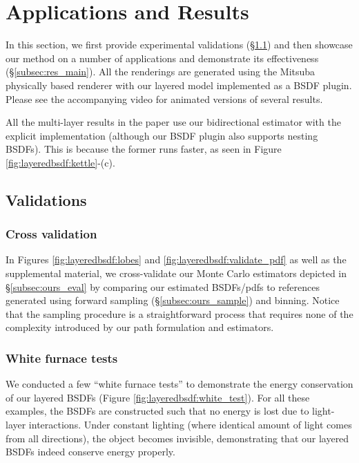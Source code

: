 \section{Applications and Results}
\label{sec:layeredbsdf:results}

In this section, we first provide experimental validations (\S\ref{subsec:res_validation}) and then showcase our method on a number of applications and demonstrate its effectiveness (\S\ref{subsec:res_main}).
All the renderings are generated using the Mitsuba physically based renderer \cite{jakob2010mitsuba} with our layered model implemented as a BSDF plugin.
Please see the accompanying video for animated versions of several results.

All the multi-layer results in the paper use our bidirectional estimator with the explicit implementation (although our BSDF plugin also supports nesting BSDFs).
This is because the former runs faster, as seen in Figure \ref{fig:layeredbsdf:kettle}-(c).

\subsection{Validations}
\label{subsec:res_validation}

\subsubsection{Cross validation}
In Figures \ref{fig:layeredbsdf:lobes} and \ref{fig:layeredbsdf:validate_pdf} as well as the supplemental material, we cross-validate our Monte Carlo estimators depicted in \S\ref{subsec:ours_eval} by comparing our estimated BSDFs/pdfs to references generated using forward sampling (\S\ref{subsec:ours_sample}) and binning. Notice that the sampling procedure is a straightforward process that requires none of the complexity introduced by our path formulation and estimators.

\subsubsection{White furnace tests}
We conducted a few ``white furnace tests'' to demonstrate the energy conservation of our layered BSDFs (Figure \ref{fig:layeredbsdf:white_test}).
For all these examples, the BSDFs are constructed such that no energy is lost due to light-layer interactions.
Under constant lighting (where identical amount of light comes from all directions), the object becomes invisible, demonstrating that our layered BSDFs indeed conserve energy properly.

